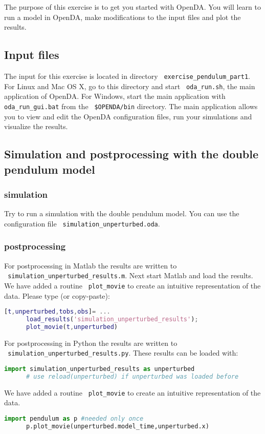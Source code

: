 The purpose of this exercise is to get you started with OpenDA. You will learn
to run a model in OpenDA, make modifications to the input files and plot the
results.
\subsection{Input files}
The input for this exercise is located in directory \texttt{ exercise\_pendulum\_part1}.
      For Linux and Mac OS X, go to this directory and start \texttt{ oda\_run.sh}, the
      main application of OpenDA. For Windows, start the main application with 
      \texttt{ oda\_run\_gui.bat} from the \texttt{ \$OPENDA/bin} directory. The main 
      application allows you to view and edit the OpenDA configuration files, run your
      simulations and visualize the results.

\subsection{Simulation and postprocessing with the double pendulum model}
\subsubsection{simulation}
Try to run a simulation with the double pendulum model. You can use the configuration file \texttt{ simulation\_unperturbed.oda}. 

\subsubsection{postprocessing}      
\ifshowmatlab
      For postprocessing in Matlab the results are written to \\ \texttt{ simulation\_unperturbed\_results.m}.
      Next start Matlab and load the results. We have added a routine \texttt{ plot\_movie} to create an intuitive
      representation of the data. Please type (or copy-paste):
      \begin{lstlisting}[language=Matlab,frame=single,caption={Matlab}]
      [t,unperturbed,tobs,obs]= ...
      load_results('simulation_unperturbed_results');
      plot_movie(t,unperturbed)
      \end{lstlisting}
\fi
      
      For postprocessing in Python the results are written to \\ \texttt{ simulation\_unperturbed\_results.py}.
      These results can be loaded with:
      \begin{lstlisting}[language=Python,frame=single,caption={Python initialize}]
      import simulation_unperturbed_results as unperturbed
      # use reload(unperturbed) if unperturbed was loaded before
      \end{lstlisting}
      We have added a routine \texttt{ plot\_movie} to create an intuitive
      representation of the data. 
      \begin{lstlisting}[language=Python,frame=single,caption={Python}]
      import pendulum as p #needed only once
      p.plot_movie(unperturbed.model_time,unperturbed.x)
      \end{lstlisting}
      

